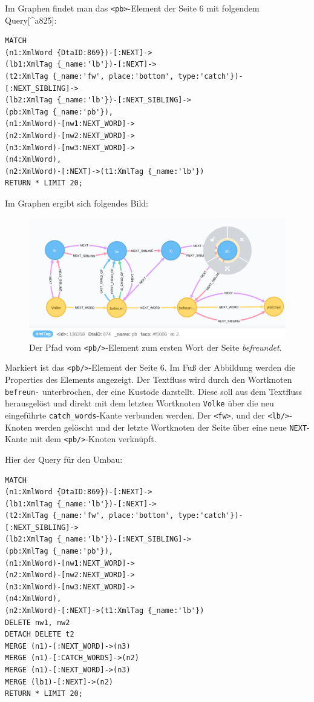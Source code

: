 \documentclass[ngerman,]{scrreprt}
\begin{document}
Im Graphen findet man das \texttt{\textless{}pb\textgreater{}}-Element der Seite 6 mit folgendem Query{[}\^{}a825{]}:

\begin{verbatim}
MATCH
(n1:XmlWord {DtaID:869})-[:NEXT]->
(lb1:XmlTag {_name:'lb'})-[:NEXT]->
(t2:XmlTag {_name:'fw', place:'bottom', type:'catch'})-[:NEXT_SIBLING]->
(lb2:XmlTag {_name:'lb'})-[:NEXT_SIBLING]->
(pb:XmlTag {_name:'pb'}),
(n1:XmlWord)-[nw1:NEXT_WORD]->
(n2:XmlWord)-[nw2:NEXT_WORD]->
(n3:XmlWord)-[nw3:NEXT_WORD]->
(n4:XmlWord),
(n2:XmlWord)-[:NEXT]->(t1:XmlTag {_name:'lb'})
RETURN * LIMIT 20;
\end{verbatim}

Im Graphen ergibt sich folgendes Bild:

\begin{figure}
\centering
\includegraphics{Bilder/TEI2Graph/pb6-Bestand.png}
\caption{Der Pfad vom \texttt{\textless{}pb/\textgreater{}}-Element zum ersten Wort der Seite \emph{befreundet}.}
\end{figure}

Markiert ist das \texttt{\textless{}pb/\textgreater{}}-Element der Seite 6. Im Fuß der Abbildung werden die Properties des Elements angezeigt. Der Textfluss wird durch den Wortknoten \texttt{befreun-} unterbrochen, der eine Kustode darstellt. Diese soll aus dem Textfluss herausgelöst und direkt mit dem letzten Wortknoten \texttt{Volke} über die neu eingeführte \texttt{catch\_words}-Kante verbunden werden. Der \texttt{\textless{}fw\textgreater{}}, und der \texttt{\textless{}lb/\textgreater{}}-Knoten werden gelöscht und der letzte Wortknoten der Seite über eine neue \texttt{NEXT}-Kante mit dem \texttt{\textless{}pb/\textgreater{}}-Knoten verknüpft.

Hier der Query für den Umbau:

\begin{verbatim}
MATCH
(n1:XmlWord {DtaID:869})-[:NEXT]->
(lb1:XmlTag {_name:'lb'})-[:NEXT]->
(t2:XmlTag {_name:'fw', place:'bottom', type:'catch'})-[:NEXT_SIBLING]->
(lb2:XmlTag {_name:'lb'})-[:NEXT_SIBLING]->
(pb:XmlTag {_name:'pb'}),
(n1:XmlWord)-[nw1:NEXT_WORD]->
(n2:XmlWord)-[nw2:NEXT_WORD]->
(n3:XmlWord)-[nw3:NEXT_WORD]->
(n4:XmlWord),
(n2:XmlWord)-[:NEXT]->(t1:XmlTag {_name:'lb'})
DELETE nw1, nw2
DETACH DELETE t2
MERGE (n1)-[:NEXT_WORD]->(n3)
MERGE (n1)-[:CATCH_WORDS]->(n2)
MERGE (n1)-[:NEXT_WORD]->(n3)
MERGE (lb1)-[:NEXT]->(n2)
RETURN * LIMIT 20;
\end{verbatim}
\end{document}
